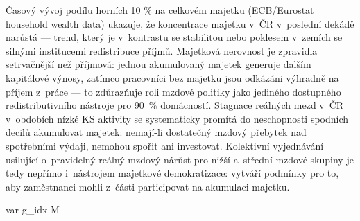 Časový vývoj podílu horních 10 \% na celkovém majetku (ECB/Eurostat household wealth data) ukazuje, že koncentrace majetku v~ČR v~poslední dekádě narůstá --- trend, který je v~kontrastu se stabilitou nebo poklesem v~zemích se silnými institucemi redistribuce příjmů.
Majetková nerovnost je zpravidla setrvačnější než příjmová: jednou akumulovaný majetek generuje dalším kapitálové výnosy, zatímco pracovníci bez majetku jsou odkázáni výhradně na příjem z~práce --- to zdůrazňuje roli mzdové politiky jako jediného dostupného redistributivního nástroje pro \SI{90}{\percent} domácností.
Stagnace reálných mezd v~ČR v~obdobích nízké \ac{KS} aktivity se systematicky promítá do neschopnosti spodních decilů akumulovat majetek: nemají-li dostatečný mzdový přebytek nad spotřebními výdaji, nemohou spořit ani investovat.
Kolektivní vyjednávání usilující o~pravidelný reálný mzdový nárůst pro nižší a~střední mzdové skupiny je tedy nepřímo i~nástrojem majetkové demokratizace: vytváří podmínky pro to, aby zaměstnanci mohli z~části participovat na akumulaci majetku.

\acs{var-g}_{\acs{idx-M}}
%
